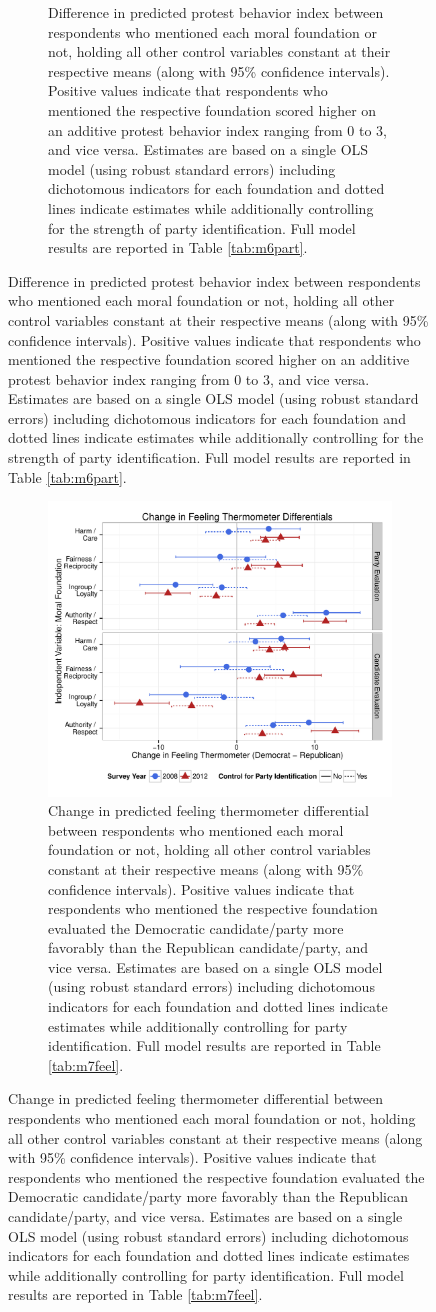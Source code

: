 \documentclass[12pt]{article}
\begin{document}
\begin{figure}[h]
\begin{subfigure}[t]{0.49\textwidth}
    \caption{Difference in predicted protest behavior index between respondents who mentioned each moral foundation or not, holding all other control variables constant at their respective means (along with 95\% confidence intervals). Positive values indicate that respondents who mentioned the respective foundation scored higher on an additive protest behavior index ranging from 0 to 3, and vice versa. Estimates are based on a single OLS model (using robust standard errors) including dichotomous indicators for each foundation and dotted lines indicate estimates while additionally controlling for the strength of party identification. Full model results are reported in Table \ref{tab:m6part}.}\label{fig:appD10part}
  \end{subfigure}
\end{figure}
\begin{figure}[h]
  \centering
  \caption{Models predicting feeling thermometer differentials and vote choice based on moral reasoning including 2008 ANES data.}
  \begin{subfigure}[t]{0.49\textwidth}
    \includegraphics[scale=.4]{../calc/fig/appD11feel.pdf}
    \caption{Change in predicted feeling thermometer differential between respondents who mentioned each moral foundation or not, holding all other control variables constant at their respective means (along with 95\% confidence intervals). Positive values indicate that respondents who mentioned the respective foundation evaluated the Democratic candidate/party more favorably than the Republican candidate/party, and vice versa. Estimates are based on a single OLS model (using robust standard errors) including dichotomous indicators for each foundation and dotted lines indicate estimates while additionally controlling for party identification. Full model results are reported in Table \ref{tab:m7feel}.}\label{fig:appD11feel}

\end{subfigure}
\end{figure}
\end{document}
